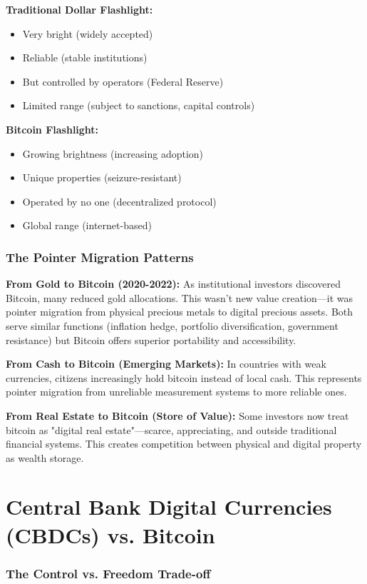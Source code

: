 \documentclass[11pt,oneside]{book}
\begin{document}
\textbf{Traditional Dollar Flashlight:}
\begin{itemize}
\item Very bright (widely accepted)
\item Reliable (stable institutions)
\item But controlled by operators (Federal Reserve)
\item Limited range (subject to sanctions, capital controls)
\end{itemize}

\textbf{Bitcoin Flashlight:}
\begin{itemize}
\item Growing brightness (increasing adoption)
\item Unique properties (seizure-resistant)
\item Operated by no one (decentralized protocol)
\item Global range (internet-based)
\end{itemize}

\subsubsection{The Pointer Migration Patterns}

\textbf{From Gold to Bitcoin (2020-2022):}
As institutional investors discovered Bitcoin, many reduced gold allocations. This wasn't new value creation—it was pointer migration from physical precious metals to digital precious assets. Both serve similar functions (inflation hedge, portfolio diversification, government resistance) but Bitcoin offers superior portability and accessibility.

\textbf{From Cash to Bitcoin (Emerging Markets):}
In countries with weak currencies, citizens increasingly hold bitcoin instead of local cash. This represents pointer migration from unreliable measurement systems to more reliable ones.

\textbf{From Real Estate to Bitcoin (Store of Value):}
Some investors now treat bitcoin as "digital real estate"—scarce, appreciating, and outside traditional financial systems. This creates competition between physical and digital property as wealth storage.

\section{Central Bank Digital Currencies (CBDCs) vs. Bitcoin}

\subsubsection{The Control vs. Freedom Trade-off}
\end{document}
